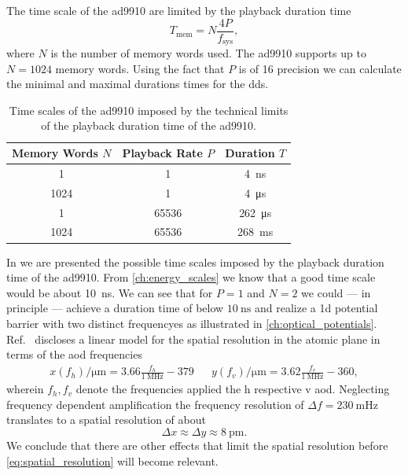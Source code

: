 The time scale of the \gls{ad9910} are limited by the playback duration time
\begin{equation}
  T_\text{mem}
  =N\frac{4P}{f_\text{sys}}
  \label{eq:dds_playback_duration},
\end{equation}
where $N$ is the number of memory words used. The \gls{ad9910} supports up to
$N=1024$ memory words. Using the fact that $P$ is of \SI{16}{\bit} precision
we can calculate the minimal and maximal durations times for the \gls{dds}.
\begin{table}[htb]
  \centering
  \begin{tabular}{ccc}
    \toprule
    Memory Words $N$ & Playback Rate $P$ & Duration $T$ \\
    \midrule
    \num{1} & \num{1} & \SI{4}{\nano\second} \\
    \num{1024} & \num{1} & \SI{4}{\micro\second} \\
    \num{1} & \num{65536} & \SI{262}{\micro\second} \\
    \num{1024} & \num{65536} & \SI{268}{\milli\second} \\
    \bottomrule
  \end{tabular}
  \caption{Time scales of the \gls{ad9910} imposed by the technical limits of
    the playback duration time of the \gls{ad9910}.
  }\label{tab:dds_time_scale}
\end{table}
In  we are presented the possible time scales
imposed by the playback duration time of the \gls{ad9910}. From
\cref{ch:energy_scales} we know that a good time scale would be about
\SI{10}{\nano\second}. We can see that for $P=1$ and $N=2$ we could --- in
principle --- achieve a duration time of below $\SI{10}{\nano\second}$ and
realize a \gls{1d} potential barrier with two distinct frequencyes as
illustrated in \cref{ch:optical_potentials}. Ref.~\cite{Hertlein2017}
discloses a linear model for the spatial resolution in the atomic plane in
terms of the \gls{aod} frequencies
\begin{align}
  x(f_h)/\si{\micro\meter}=3.66\frac{f_h}{\SI{1}{\mega\hertz}}-379 &&
  y(f_v)/\si{\micro\meter}=3.62\frac{f_v}{\SI{1}{\mega\hertz}}-360
  \label{eq:spatial_position_frequency},
\end{align}
wherein $f_h,f_v$ denote the frequencies applied the \gls{h} respective
\gls{v} \gls{aod}. Neglecting frequency dependent amplification the frequency
resolution of $\Delta f=\SI{230}{\milli\hertz}$ translates to a spatial
resolution of about
\begin{equation}
  \Delta x\approx \Delta y\approx\SI{8}{\pico\meter}
  \label{eq:spatial_resolution}.
\end{equation}
We conclude that there are other effects that limit the spatial resolution
before \cref{eq:spatial_resolution} will become relevant.
